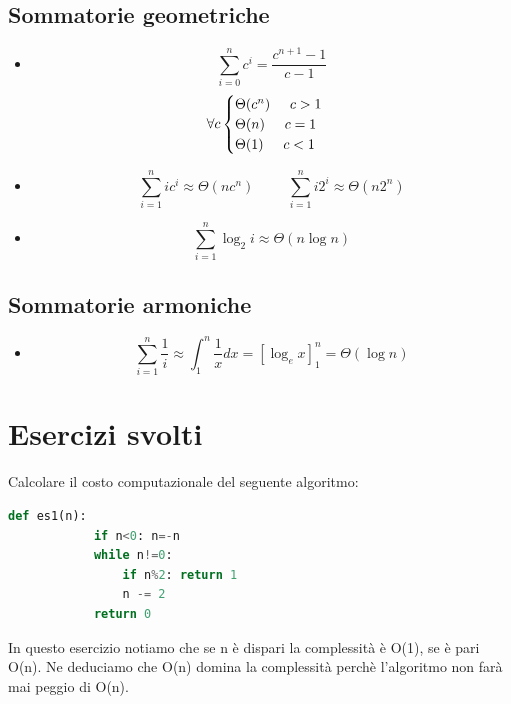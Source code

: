 \section{Sommatorie geometriche}
\begin{itemize}
    \item \begin{equation*}\sum^n_{i=0}c^i=\frac{c^{n+1}-1}{c-1}\end{equation*}$$\forall c\begin{cases}\Theta(c^n)\hspace{0.5cm}c>1\\\Theta(n)\hspace{0.5cm}c=1\\\Theta(1)\hspace{0.5cm}c<1\end{cases}$$
    
    \item \begin{equation*}\sum^n_{i=1}ic^i\approx\Theta(nc^n)\hspace{1cm}\sum^n_{i=1}i2^i\approx\Theta(n2^n)\end{equation*}
    \item \begin{equation*}\sum^n_{i=1}\log_2i\approx\Theta(n\log n)\end{equation*}
\end{itemize}

\section{Sommatorie armoniche}
\begin{itemize}
    \item \begin{equation*}\sum^n_{i=1}\frac{1}{i}\approx\int_1^n\frac{1}{x}dx=\left[\log_ex\right]_1^n=\Theta(\log n)\end{equation*}
\end{itemize}


\chapter*{Esercizi svolti}
\begin{exercise}
    Calcolare il costo computazionale del seguente algoritmo:
    \begin{lstlisting}[language=Python]
        def es1(n):
            if n<0: n=-n
            while n!=0:
                if n%2: return 1
                n -= 2
            return 0
    \end{lstlisting}
    
    In questo esercizio notiamo che se n è dispari la complessità è O(1), se è pari O(n). Ne deduciamo che O(n) domina la complessità perchè l'algoritmo non farà mai peggio di O(n).
\end{exercise}

